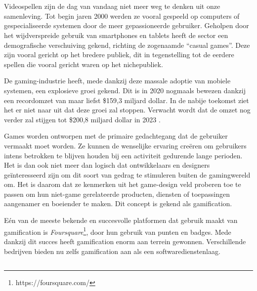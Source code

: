 
\chapter{}
\label{ch:inleiding}

Videospellen zijn de dag van vandaag niet meer weg te denken uit onze samenleving. Tot begin jaren 2000 werden ze vooral gespeeld op computers of gespecialiseerde systemen door de meer gepassioneerde gebruiker. Geholpen door het wijdverspreide gebruik van smartphones en tablets heeft de sector een demografische verschuiving gekend, richting de zogenaamde ``casual games''. Deze zijn vooral gericht op het bredere publiek, dit in tegenstelling tot de eerdere spellen die vooral gericht waren op het nichepubliek.

De gaming-industrie heeft, mede dankzij deze massale adoptie van mobiele systemen, een explosieve groei gekend. Dit is in 2020 nogmaals bewezen dankzij een recordomzet van maar liefst \$159,3 miljard dollar. In de nabije toekomst ziet het er niet naar uit dat deze groei zal stoppen. Verwacht wordt dat de omzet nog verder zal stijgen tot \$200,8 miljard dollar in 2023 \autocite{WePC2021}.

Games worden ontworpen met de primaire gedachtegang dat de gebruiker vermaakt moet worden. Ze kunnen de wenselijke ervaring creëren om gebruikers intens betrokken te blijven houden bij een activiteit gedurende lange perioden. Het is dan ook niet meer dan logisch dat ontwikkelaars en designers geïnteresseerd zijn om dit soort van gedrag te stimuleren buiten de gamingwereld om. Het is daarom dat ze kenmerken uit het game-design veld proberen toe te passen om hun niet-game gerelateerde producten, diensten of toepassingen aangenamer en boeiender te maken. Dit concept is gekend als gamification.

Eén van de meeste bekende en succesvolle platformen dat gebruik maakt van gamification is \textit{Foursquare}\footnote{https://foursquare.com/}, door hun gebruik van punten en badges. Mede dankzij dit succes heeft gamification enorm aan terrein gewonnen. Verschillende bedrijven bieden nu zelfs gamification aan als een softwaredienstenlaag.

\section{}
\label{sec:probleemstelling}

